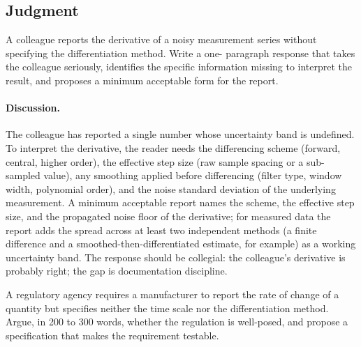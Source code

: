 \subsection*{Judgment}

\begin{exercise}
A colleague reports the derivative of a noisy measurement series
without specifying the differentiation method. Write a one-
paragraph response that takes the colleague seriously, identifies
the specific information missing to interpret the result, and
proposes a minimum acceptable form for the report.
\end{exercise}

\paragraph{Discussion.}
The colleague has reported a single number whose uncertainty band
is undefined. To interpret the derivative, the reader needs the
differencing scheme (forward, central, higher order), the
effective step size (raw sample spacing or a sub-sampled value),
any smoothing applied before differencing (filter type, window
width, polynomial order), and the noise standard deviation of
the underlying measurement. A minimum acceptable report names the
scheme, the effective step size, and the propagated noise floor
of the derivative; for measured data the report adds the spread
across at least two independent methods (a finite difference and
a smoothed-then-differentiated estimate, for example) as a
working uncertainty band. The response should be collegial: the
colleague's derivative is probably right; the gap is documentation
discipline.

\begin{exercise}
A regulatory agency requires a manufacturer to report the rate
of change of a quantity but specifies neither the time scale nor
the differentiation method. Argue, in 200 to 300 words, whether
the regulation is well-posed, and propose a specification that
makes the requirement testable.
\end{exercise}

